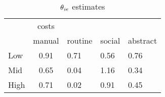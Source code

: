 \begin{table}[htbp]\centering \caption{$\theta\\_{ie}$ estimates} \begin{tabular}{l*{1}{c}} \toprule
            &       costs&            &            &            \\
            &      manual&     routine&      social&    abstract\\
\midrule
Low         &        0.91&        0.71&        0.56&        0.76\\
Mid         &        0.65&        0.04&        1.16&        0.34\\
High        &        0.71&        0.02&        0.91&        0.45\\
\bottomrule
\end{tabular}
\end{table}
